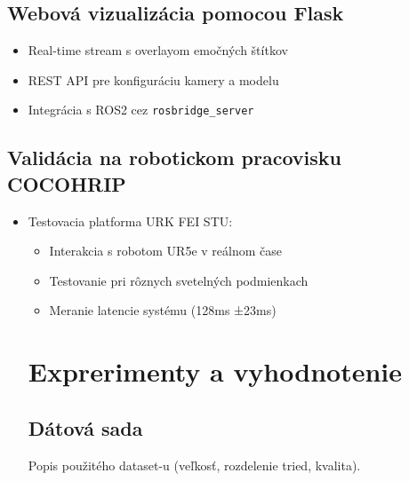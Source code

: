 \subsection{Webová vizualizácia pomocou Flask}
\begin{itemize}
\item Real-time stream s overlayom emočných štítkov
\item REST API pre konfiguráciu kamery a modelu
\item Integrácia s ROS2 cez \texttt{rosbridge\_server}
\end{itemize}

\subsection{Validácia na robotickom pracovisku COCOHRIP}
    \begin{itemize}
\item Testovacia platforma URK FEI STU:
  \begin{itemize}
  \item Interakcia s robotom UR5e v reálnom čase
  \item Testovanie pri rôznych svetelných podmienkach
  \item Meranie latencie systému (128ms ±23ms)
  \end{itemize}



\section{Exprerimenty a vyhodnotenie}
\subsection{Dátová sada} Popis použitého dataset-u (veľkosť, rozdelenie tried, kvalita).

\end{itemize}
